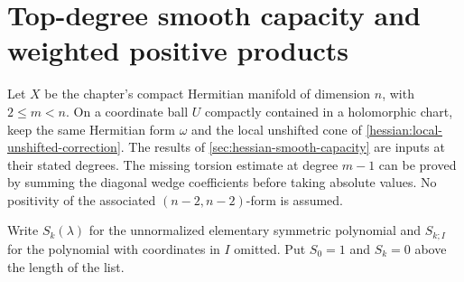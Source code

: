 \section{Top-degree smooth capacity and weighted positive products}
\label{draft623:top-capacity}

Let $X$ be the chapter's compact Hermitian manifold of dimension $n$,
with $2\leq m<n$. On a coordinate ball $U$ compactly contained in a
holomorphic chart, keep the same Hermitian form $\omega$ and the local
unshifted cone of \cref{hessian:local-unshifted-correction}.
The results of \cref{sec:hessian-smooth-capacity} are inputs at their
stated degrees. The missing torsion estimate at degree $m-1$ can be
proved by summing the diagonal wedge coefficients before taking
absolute values. No positivity of the associated $(n-2,n-2)$-form is
assumed.

Write $S_k(\lambda)$ for the unnormalized elementary symmetric
polynomial and $S_{k;I}$ for the polynomial with coordinates in $I$
omitted. Put $S_0=1$ and $S_k=0$ above the length of the list.

